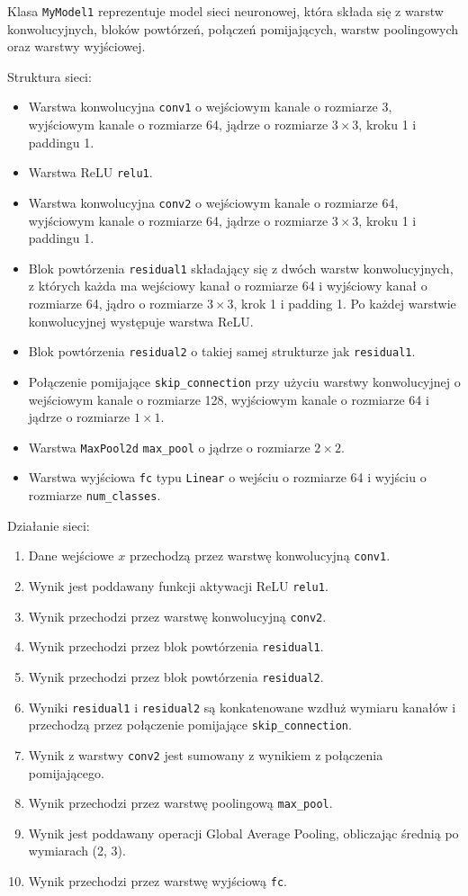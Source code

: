 \documentclass[12pt,twoside]{article}
\begin{document}
Klasa \texttt{MyModel1} reprezentuje model sieci neuronowej, która składa się z warstw konwolucyjnych, bloków powtórzeń, połączeń pomijających, warstw poolingowych oraz warstwy wyjściowej.

Struktura sieci:
\begin{itemize}
  \item Warstwa konwolucyjna \texttt{conv1} o wejściowym kanale o rozmiarze 3, wyjściowym kanale o rozmiarze 64, jądrze o rozmiarze $3\times3$, kroku 1 i paddingu 1.
  \item Warstwa ReLU \texttt{relu1}.
  \item Warstwa konwolucyjna \texttt{conv2} o wejściowym kanale o rozmiarze 64, wyjściowym kanale o rozmiarze 64, jądrze o rozmiarze $3\times3$, kroku 1 i paddingu 1.
  \item Blok powtórzenia \texttt{residual1} składający się z dwóch warstw konwolucyjnych, z których każda ma wejściowy kanał o rozmiarze 64 i wyjściowy kanał o rozmiarze 64, jądro o rozmiarze $3\times3$, krok 1 i padding 1. Po każdej warstwie konwolucyjnej występuje warstwa ReLU.
  \item Blok powtórzenia \texttt{residual2} o takiej samej strukturze jak \texttt{residual1}.
  \item Połączenie pomijające \texttt{skip\_connection} przy użyciu warstwy konwolucyjnej o wejściowym kanale o rozmiarze 128, wyjściowym kanale o rozmiarze 64 i jądrze o rozmiarze $1\times1$.
  \item Warstwa \texttt{MaxPool2d} \texttt{max\_pool} o jądrze o rozmiarze $2\times2$.
  \item Warstwa wyjściowa \texttt{fc} typu \texttt{Linear} o wejściu o rozmiarze 64 i wyjściu o rozmiarze \texttt{num\_classes}.
\end{itemize}

Działanie sieci:
\begin{enumerate}
  \item Dane wejściowe $x$ przechodzą przez warstwę konwolucyjną \texttt{conv1}.
  \item Wynik jest poddawany funkcji aktywacji ReLU \texttt{relu1}.
  \item Wynik przechodzi przez warstwę konwolucyjną \texttt{conv2}.
  \item Wynik przechodzi przez blok powtórzenia \texttt{residual1}.
  \item Wynik przechodzi przez blok powtórzenia \texttt{residual2}.
  \item Wyniki \texttt{residual1} i \texttt{residual2} są konkatenowane wzdłuż wymiaru kanałów i przechodzą przez połączenie pomijające \texttt{skip\_connection}.
  \item Wynik z warstwy \texttt{conv2} jest sumowany z wynikiem z połączenia pomijającego.
  \item Wynik przechodzi przez warstwę poolingową \texttt{max\_pool}.
  \item Wynik jest poddawany operacji Global Average Pooling, obliczając średnią po wymiarach (2, 3).
  \item Wynik przechodzi przez warstwę wyjściową \texttt{fc}.
\end{enumerate}
\end{document}
